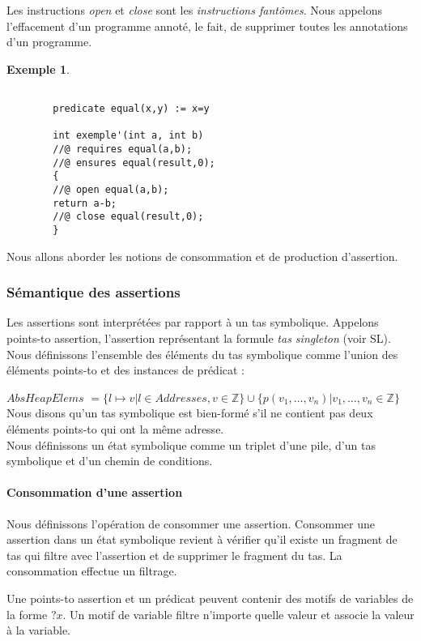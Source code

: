 \documentclass[11pt,openany]{article}
\newtheorem{exemple}{Exemple}
\begin{document}
	Les instructions \textit{open} et \textit{close} sont les \textit{instructions fant\^omes}. Nous appelons l'effacement d'un programme annot\'e, le fait, de supprimer toutes les annotations d'un programme.
	\begin{exemple}
		\begin{lstlisting}
		
		predicate equal(x,y) := x=y
		
		int exemple'(int a, int b)
		//@ requires equal(a,b);
		//@ ensures equal(result,0);
		{
		//@ open equal(a,b);
		return a-b;
		//@ close equal(result,0);
		}
		\end{lstlisting}
	\end{exemple}
	Nous allons aborder les notions de consommation et de production d'assertion. 
		\subsubsection{S\'emantique des assertions}
	Les assertions sont interpr\'et\'ees par rapport \`a un tas symbolique.
	Appelons points-to assertion, l'assertion repr\'esentant la formule \textit{tas singleton} (voir SL). Nous d\'efinissons l'ensemble des \'el\'ements du tas symbolique comme l'union des \'el\'ements points-to et des instances de pr\'edicat :
	
	$AbsHeapElems$ $= \{l\mapsto v| l\in Addresses, v\in \mathbb{Z}\}\cup\{p(v_1,\ldots, v_n)|v_1,\ldots,v_n\in\mathbb{Z}\}$\\
	Nous disons qu'un tas symbolique est bien-form\'e s'il ne contient pas deux \'el\'ements points-to qui ont la m\^eme adresse.\\
	Nous d\'efinissons un \'etat symbolique comme un triplet d'une pile, d'un tas symbolique et d'un chemin de conditions.
	
			\paragraph{Consommation d'une assertion}
			Nous d\'efinissons l'op\'eration de consommer une assertion. Consommer une assertion dans un \'etat symbolique revient \`a v\'erifier qu'il existe un fragment de tas qui filtre avec l'assertion et de supprimer le fragment du tas. La consommation effectue un filtrage.
	
	Une points-to assertion et un pr\'edicat peuvent contenir des motifs de variables de la forme $?x$. Un motif de variable filtre n'importe quelle valeur et associe la valeur \`a la variable.
	
\end{document}

